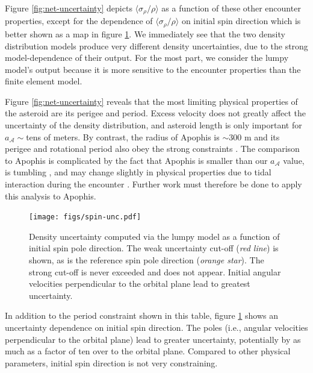 \documentclass[fleqn,usenatbib]{mnras}
\begin{document}
Figure \ref{fig:net-uncertainty} depicts $\langle \sigma_\rho / \rho \rangle$ as a function of these other encounter properties, except for the dependence of $\langle \sigma_\rho / \rho \rangle$ on initial spin direction which is better shown as a map in figure \ref{fig:spin-uncertainty}. We immediately see that the two density distribution models produce very different density uncertainties, due to the strong model-dependence of their output. For the most part, we consider the lumpy model's output because it is more sensitive to the encounter properties than the finite element model. 

Figure \ref{fig:net-uncertainty} reveals that the most limiting physical properties of the asteroid are its perigee and period. Excess velocity does not greatly affect the uncertainty of the density distribution, and asteroid length is only important for $a_\mathcal{A}\sim $tens of meters. By contrast, the radius of Apophis is  $\sim 300$ m and its perigee and rotational period also obey the strong constraints \citep{giorgini2008predicting}. The comparison to Apophis is complicated by the fact that Apophis is smaller than our $a_\mathcal{A}$ value, is tumbling \citep{PRAVEC201448}, and may change slightly in physical properties due to tidal interaction during the encounter \citep{yu2014numerical,hirabayashi2021finite}. Further work must therefore be done to apply this analysis to Apophis.

\begin{figure}
  \centering
  \texttt{[image: figs/spin-unc.pdf]}
  \caption{Density uncertainty computed via the lumpy model as a function of initial spin pole direction. The weak uncertainty cut-off (\textit{red line}) is shown, as is the reference spin pole direction (\textit{orange star}). The strong cut-off is never exceeded and does not appear. Initial angular velocities perpendicular to the orbital plane lead to greatest uncertainty.}
  \label{fig:spin-uncertainty}
\end{figure}

In addition to the period constraint shown in this table, figure \ref{fig:spin-uncertainty} shows an uncertainty dependence on initial spin direction. The poles (i.e., angular velocities perpendicular to the orbital plane) lead to greater uncertainty, potentially by as much as a factor of ten over to the orbital plane. Compared to other physical parameters, initial spin direction is not very constraining.
\end{document}

